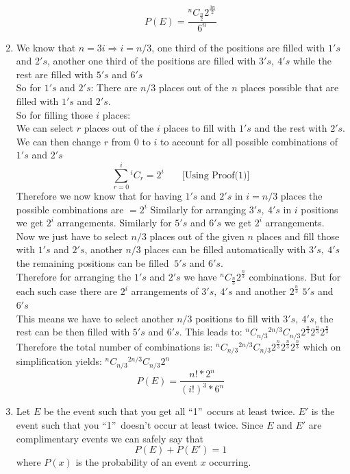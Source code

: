 \documentclass[10pt]{article}
\newcommand*{\Co}[2]{{}^{#1}C_{#2}}%
\newenvironment{solution}[2][Solution]{ \begin{trivlist}
\item[\hskip \labelsep {\bfseries #1}]}{\end{trivlist}}
\begin{document}
\begin{solution}{1}
\begin{enumerate}[label=(\alph*)]
     $$P(E) = \frac{\Co{n}{\frac{n}{2}} 2^{\frac{3n}{2}}}{6^n}$$

    \item We know that $n=3i \Rightarrow i = n/3$, one third of the positions are filled with $1's$ and $2's$, another one third of the positions are filled with $3's,\ 4's$ while the rest are filled with $5's$ and $6's$\\
    So for $1's$ and $2's$: There are $n/3$ places out of the $n$ places possible that are filled with $1's$ and $2's$.\\
    So for filling those $i$ places:\\
    We can select $r$ places out of the $i$ places to fill with $1's$ and the rest with $2's$. We can then change $r$ from $0$ to $i$ to account for all possible combinations of $1's$ and $2's$\\
    $$\sum_{r=0}^{i} \Co{i}{r} = 2^i\ \ \ \ \ \ \  \text{           [Using Proof(1)]}$$
    Therefore we now know that for having $1's$ and $2's$ in $i=n/3$ places the possible combinations are $=2^{i}$
    Similarly for arranging $3's,\ 4's$ in $i$ positions we get $2^{i}$ arrangements. Similarly for $5's$ and $6's$ we get $2^{i}$ arrangements.\\

    Now we just have to select $n/3$ places out of the given $n$ places and fill those with $1's$ and $2's$, another $n/3$ places can be filled automatically with $3's,\ 4's$ the remaining positions can be filled $\ 5's$ and $6's$.\\
    Therefore for arranging the $1's$ and $2's$ we have $\Co{n}{\frac{n}{3}} 2^{\frac{n}{3}}$ combinations. But for each such case there are $2^i$ arrangements of $3's,\ 4's$ and another $2^{\frac{n}{3}}$ $5's$ and $6's$\\
    This means we have to select another $n/3$ positions to fill with $3's,\ 4's$, the rest can be then filled with $5's$ and $6's$. This leads to: $\Co{n}{n/3} \Co{2n/3}{n/3} 2^{\frac{n}{3}} 2^{\frac{n}{3}} 2^{\frac{n}{3}}$\\
    Therefore the total number of combinations is: $\Co{n}{n/3} \Co{2n/3}{n/3} 2^{\frac{n}{3}} 2^{\frac{n}{3}} 2^{\frac{n}{3}}$ which on simplification yields: $\Co{n}{n/3} \Co{2n/3}{n/3} 2^{n}$ $$P(E) =\frac{n!*2^n}{(i!)^3 * 6^n}$$
    \item Let $E$ be the event such that you get all \textquotedblleft1\textquotedblright \ occurs at least twice. $E'$ is the event such that you \textquotedblleft1\textquotedblright \ doesn't occur at least twice. Since $E$ and $E'$ are complimentary events we can safely say that $$P(E) + P(E') = 1$$ where $P(x)$ is the probability of an event $x$ occurring.


\end{enumerate}
\end{solution}
\end{document}
